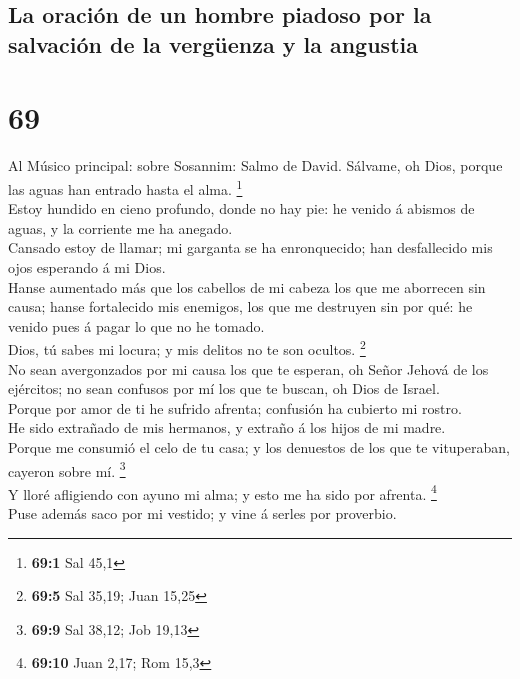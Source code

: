 \hypertarget{la-oraciuxf3n-de-un-hombre-piadoso-por-la-salvaciuxf3n-de-la-verguxfcenza-y-la-angustia}{%
\subsection{La oración de un hombre piadoso por la salvación de la
vergüenza y la
angustia}\label{la-oraciuxf3n-de-un-hombre-piadoso-por-la-salvaciuxf3n-de-la-verguxfcenza-y-la-angustia}}

\hypertarget{section-68}{%
\section{69}\label{section-68}}

 Al Músico principal: sobre Sosannim: Salmo de David.
Sálvame, oh Dios, porque las aguas han entrado hasta el alma.
\footnote{\textbf{69:1} Sal 45,1}\\
 Estoy hundido en cieno profundo, donde no hay pie: he
venido á abismos de aguas, y la corriente me ha anegado.\\
 Cansado estoy de llamar; mi garganta se ha enronquecido;
han desfallecido mis ojos esperando á mi Dios.\\
 Hanse aumentado más que los cabellos de mi cabeza los que
me aborrecen sin causa; hanse fortalecido mis enemigos, los que me
destruyen sin por qué: he venido pues á pagar lo que no he tomado.\\
 Dios, tú sabes mi locura; y mis delitos no te son ocultos.
\footnote{\textbf{69:5} Sal 35,19; Juan 15,25}\\
 No sean avergonzados por mi causa los que te esperan, oh
Señor Jehová de los ejércitos; no sean confusos por mí los que te
buscan, oh Dios de Israel.\\
 Porque por amor de ti he sufrido afrenta; confusión ha
cubierto mi rostro.\\
 He sido extrañado de mis hermanos, y extraño á los hijos de
mi madre.\\
 Porque me consumió el celo de tu casa; y los denuestos de
los que te vituperaban, cayeron sobre mí. \footnote{\textbf{69:9} Sal
  38,12; Job 19,13}\\
 Y lloré afligiendo con ayuno mi alma; y esto me ha sido
por afrenta. \footnote{\textbf{69:10} Juan 2,17; Rom 15,3}\\
 Puse además saco por mi vestido; y vine á serles por
proverbio.\\

